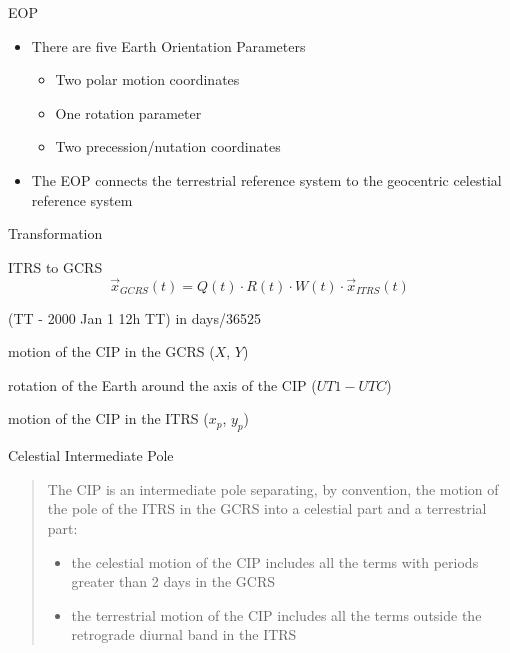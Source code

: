 \documentclass[14pt,table,t, c]{beamer}
\begin{document}
\begin{frame}{EOP}
\begin{itemize}
\item There are five Earth Orientation Parameters 
\begin{itemize}
\item Two polar motion coordinates
\item One rotation parameter
\item Two precession/nutation coordinates
\end{itemize}
\item The EOP connects the terrestrial reference system to the geocentric celestial reference system
\end{itemize}
\end{frame}

\begin{frame}{Transformation}
\begin{block}{ITRS to GCRS}
\vspace*{-\baselineskip}\setlength\belowdisplayskip{0pt}\setlength\abovedisplayskip{0pt}
\begin{equation*}
\vec{x}_{GCRS}(t) = Q(t) \cdot R(t) \cdot W(t) \cdot \vec{x}_{ITRS}(t) 
\end{equation*}
\end{block}
\vfill
\begin{description}[W ]
\item[$t$] (TT - 2000 Jan 1 12h TT) in days/36525
\item[$Q$] motion of the CIP in the GCRS ($X$, $Y$)
\item[$R$] rotation of the Earth around the axis of the CIP ($UT1-UTC$)
\item[$W$] motion of the CIP in the ITRS ($x_p$, $y_p$)
\end{description}
\end{frame}


\begin{frame}{Celestial Intermediate Pole}
\begin{quote}
The CIP is an intermediate pole separating, by convention, the motion of the pole of the ITRS in the GCRS into a celestial part and a terrestrial part:
\begin{itemize}
\item the celestial motion of the CIP includes all the terms with periods greater than 2 days in the GCRS
\item the terrestrial motion of the CIP includes all the terms outside the retrograde diurnal band in the ITRS
\end{itemize}
\end{quote}
\end{frame}
\end{document}
